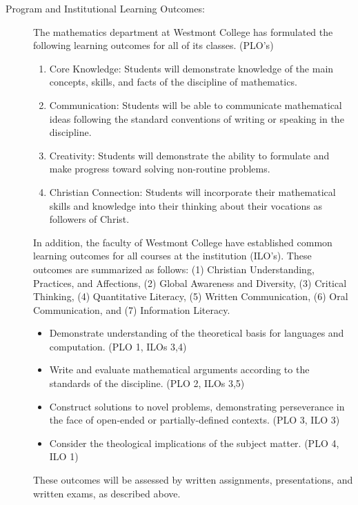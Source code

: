 \documentclass[
  twoside]{article}
\begin{document}
\begin{description}
\item[Program and Institutional Learning Outcomes:] The
         mathematics department at Westmont College has formulated the
         following learning outcomes for all of its classes. (PLO's)
\begin{enumerate}[noitemsep]
\item Core Knowledge: Students will demonstrate knowledge of the
                  main concepts, skills, and facts of the discipline of
                  mathematics.
\item Communication: Students will be able to communicate mathematical ideas
     following the standard conventions of writing or speaking in the
     discipline.
\item Creativity: Students will demonstrate the ability to formulate and make
     progress toward solving non-routine problems.
\item Christian Connection: Students will incorporate their mathematical skills
     and knowledge into their thinking about their vocations as followers of
     Christ.
         \end{enumerate}
         In addition, the faculty of Westmont College have established common
         learning outcomes for all courses at the institution
         (ILO's). These outcomes are summarized as follows:
(1) Christian Understanding, Practices, and Affections,
(2) Global Awareness and Diversity,
(3) Critical Thinking,
(4) Quantitative Literacy,
(5) Written Communication,
(6) Oral Communication, and
(7) Information Literacy.

\begin{itemize}[noitemsep]
    \item Demonstrate understanding of the theoretical basis for languages and computation.
             (PLO 1, ILOs 3,4)
    \item Write and evaluate mathematical arguments according to the
             standards of the discipline. (PLO 2,
              ILOs 3,5)
    \item Construct solutions to novel problems,
               demonstrating perseverance in the face of open-ended or
               partially-defined contexts. (PLO 3, ILO 3)
    \item Consider the theological implications of the subject matter. (PLO 4, ILO 1)
\end{itemize}
These outcomes will be assessed by written assignments, presentations, and written exams, as described above.

\end{description}
\end{document}
